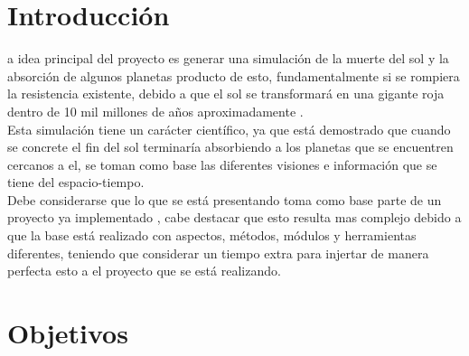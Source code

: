 \documentclass[12pt,journal,compsoc]{IEEEtran}
\begin{document}
\maketitle


\IEEEdisplaynontitleabstractindextext


%
\IEEEpeerreviewmaketitle



\section{Introducción}
a idea principal del proyecto es generar una simulación de la muerte del sol y la absorción de algunos planetas producto de esto, fundamentalmente si se rompiera la resistencia existente, debido a que el sol se transformará en una gigante roja dentro de 10 mil millones de años aproximadamente \cite{Baker2015}. \\
Esta simulación tiene un carácter científico, ya que está demostrado que cuando se concrete el fin del sol terminaría absorbiendo a los planetas que se encuentren cercanos a el, se toman como base las diferentes visiones e información que se tiene del espacio-tiempo.\\
Debe considerarse que lo que se está presentando toma como base parte de un proyecto ya implementado \cite{anterior}, cabe destacar que esto resulta mas complejo debido a que la base está realizado con aspectos, métodos, módulos y herramientas diferentes, teniendo que considerar un tiempo extra para injertar de manera perfecta esto a el proyecto que se está realizando.
\section{Objetivos}
\end{document}
